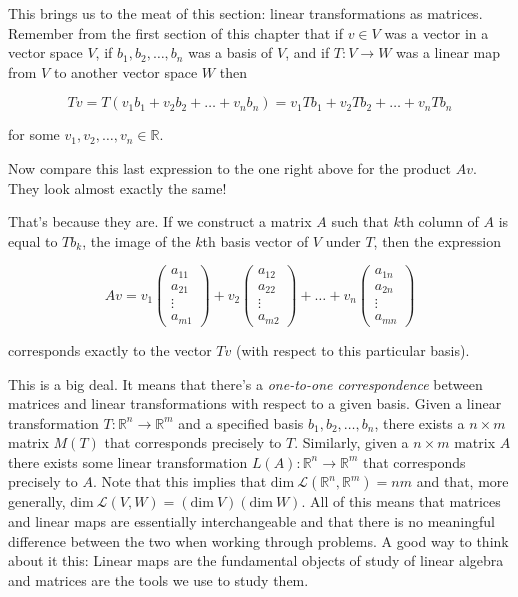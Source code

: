 \documentclass[12pt]{article}
\begin{document}
\vskip 3mm
This brings us to the meat of this section: linear transformations as matrices. Remember from the first section of this chapter that if $v \in V$ was a vector in a vector space $V$, if $b_1, b_2, \ldots, b_n$ was a basis of $V$, and if $T : V \rightarrow W$ was a linear map from $V$ to another vector space $W$ then

$$Tv = T(v_1 b_1 + v_2 b_2 + \ldots + v_n b_n) = v_1 Tb_1 + v_2 Tb_2 + \ldots + v_n Tb_n$$

for some $v_1, v_2, \ldots, v_n \in \mathbb{R}$.

\vskip 3mm

Now compare this last expression to the one right above for the product $Av$. They look almost exactly the same!

\vskip 2mm
That's because they are. If we construct a matrix $A$ such that $k$th column of $A$ is equal to $Tb_k$, the image of the $k$th basis vector of $V$ under $T$, then the expression

\[ Av = 
%
v_1  \begin{pmatrix}
a_{11} \\
a_{21} \\
\vdots \\
a_{m1}
\end{pmatrix} +
%
v_2  \begin{pmatrix}
a_{12} \\
a_{22} \\
\vdots \\
a_{m2}
\end{pmatrix} +
\ldots +
%
v_n  \begin{pmatrix}
a_{1n} \\
a_{2n} \\
\vdots \\
a_{mn}
\end{pmatrix} \]

\vskip 1mm

corresponds exactly to the vector $Tv$ (with respect to this particular basis).

\vskip 3mm
This is a big deal. It means that there's a \textit{one-to-one correspondence} between matrices and linear transformations with respect to a given basis. Given a linear transformation $T : \mathbb{R}^n \rightarrow \mathbb{R}^m$ and a specified basis $b_1, b_2, \ldots, b_n$, there exists a $n \times m$ matrix $M(T)$ that corresponds precisely to $T$. Similarly, given a $n \times m$ matrix $A$ there exists some linear transformation $L(A) : \mathbb{R}^n \rightarrow \mathbb{R}^m$ that corresponds precisely to $A$. Note that this implies that $\textrm{dim} \: \mathcal{L}(\mathbb{R}^n, \mathbb{R}^m) = nm$ and that, more generally, $\textrm{dim} \: \mathcal{L}(V, W) = (\textrm{dim} \: V)(\textrm{dim} \: W)$. All of this means that matrices and linear maps are essentially interchangeable and that there is no meaningful difference between the two when working through problems. A good way to think about it this:  Linear maps are the fundamental objects of study of linear algebra and matrices are the tools we use to study them.
\end{document}
